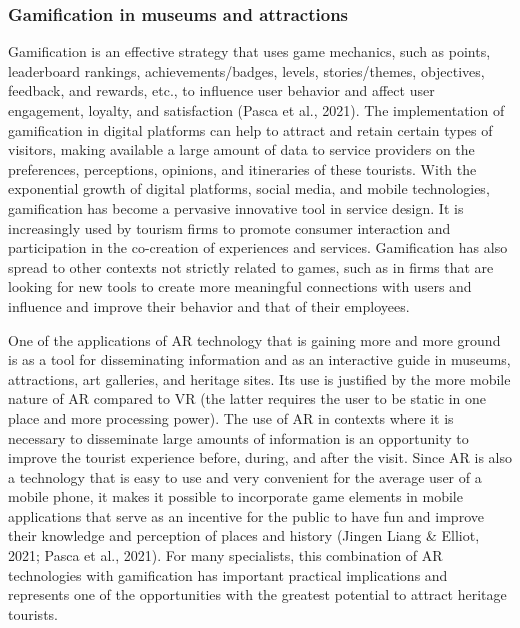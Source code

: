 \documentclass[
  letterpaper,
  DIV=11,
  numbers=noendperiod]{scrreprt}
\begin{document}
\hypertarget{gamification-in-museums-and-attractions}{%
\subsubsection{Gamification in museums and
attractions}\label{gamification-in-museums-and-attractions}}

Gamification is an effective strategy that uses game mechanics, such as
points, leaderboard rankings, achievements/badges, levels,
stories/themes, objectives, feedback, and rewards, etc., to influence
user behavior and affect user engagement, loyalty, and satisfaction
(Pasca et al., 2021). The implementation of gamification in digital
platforms can help to attract and retain certain types of visitors,
making available a large amount of data to service providers on the
preferences, perceptions, opinions, and itineraries of these tourists.
With the exponential growth of digital platforms, social media, and
mobile technologies, gamification has become a pervasive innovative tool
in service design. It is increasingly used by tourism firms to promote
consumer interaction and participation in the co-creation of experiences
and services. Gamification has also spread to other contexts not
strictly related to games, such as in firms that are looking for new
tools to create more meaningful connections with users and influence and
improve their behavior and that of their employees.

One of the applications of AR technology that is gaining more and more
ground is as a tool for disseminating information and as an interactive
guide in museums, attractions, art galleries, and heritage sites. Its
use is justified by the more mobile nature of AR compared to VR (the
latter requires the user to be static in one place and more processing
power). The use of AR in contexts where it is necessary to disseminate
large amounts of information is an opportunity to improve the tourist
experience before, during, and after the visit. Since AR is also a
technology that is easy to use and very convenient for the average user
of a mobile phone, it makes it possible to incorporate game elements in
mobile applications that serve as an incentive for the public to have
fun and improve their knowledge and perception of places and history
(Jingen Liang \& Elliot, 2021; Pasca et al., 2021). For many
specialists, this combination of AR technologies with gamification has
important practical implications and represents one of the opportunities
with the greatest potential to attract heritage tourists.
\end{document}
